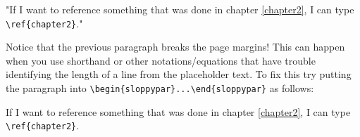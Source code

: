 "If I want to reference something that was done in chapter \ref{chapter2}, I can type \verb+\ref{chapter2}+."

Notice that the previous paragraph breaks the page margins! This can happen when you use shorthand or other notations/equations that have trouble identifying the length of a line from the placeholder text. To fix this try putting the paragraph into \verb+\begin{sloppypar}...\end{sloppypar}+ as follows:

\begin{sloppypar}
If I want to reference something that was done in chapter \ref{chapter2}, I can type \verb+\ref{chapter2}+. 
\end{sloppypar}

